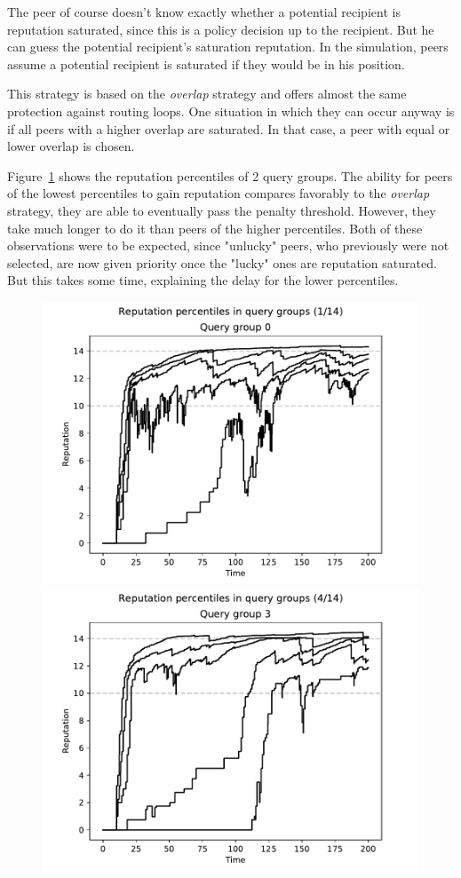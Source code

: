 The peer of course doesn't know exactly whether a potential recipient is
reputation saturated, since this is a policy decision up to the recipient. But
he can guess the potential recipient's saturation reputation. In the simulation,
peers assume a potential recipient is saturated if they would be in his
position.

This strategy is based on the \emph{overlap} strategy and offers almost the same
protection against routing loops. One situation in which they can occur anyway
is if all peers with
a higher overlap are saturated. In that case, a peer with equal or lower overlap
is chosen.

Figure~\ref{fig:selection_overlap_high_rep_last_rep_percs} shows the reputation
percentiles of 2 query groups. The ability for peers of the lowest percentiles
to gain reputation compares favorably to the \emph{overlap} strategy, they are
able to eventually pass the penalty threshold. However, they take much longer to
do it than peers of the higher percentiles. Both of these observations were to
be expected, since "unlucky" peers, who previously were not selected, are now
given priority once the "lucky" ones are reputation saturated. But this takes
some time, explaining the delay for the lower percentiles.

\begin{figure}[t]
\centering
\includegraphics[width=0.5\columnwidth]{figures/selection_overlap_high_rep_last_rep_percs_1_of_14}%
\includegraphics[width=0.5\columnwidth]{figures/selection_overlap_high_rep_last_rep_percs_4_of_14}
\label{fig:selection_overlap_high_rep_last_rep_percs}
\end{figure}

